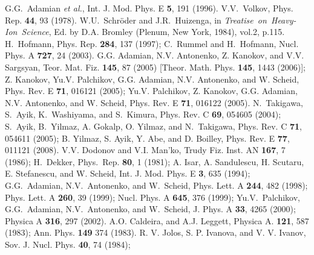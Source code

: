 \documentclass[preprint,review,12pt]{elsarticle}
\begin{document}




\begin{thebibliography}{99}
       G.G.~Adamian {\it et al.}, Int. J.  Mod. Phys. E {\bf 5}, 191 (1996).
         V.V.~Volkov, Phys. Rep. {\bf 44}, 93 (1978).
    W.U.~Schr\"oder and  J.R.~Huizenga, in {\it Treatise~on~Heavy-Ion~Science},
                      Ed. by D.A. Bromley (Plenum, New York, 1984), vol.2, p.115.
      H.~Hofmann, Phys. Rep.  {\bf 284}, 137 (1997);
                      C.~Rummel and H.~Hofmann, Nucl. Phys. A {\bf 727}, 24 (2003).
         G.G. Adamian, N.V. Antonenko, Z. Kanokov, and V.V. Sargsyan, Teor. Mat. Fiz. {\bf 145}, 87 (2005)
                      [Theor. Math. Phys. {\bf 145}, 1443 (2006)];
                      Z. Kanokov, Yu.V. Palchikov,  G.G. Adamian, N.V. Antonenko, and W. Scheid, Phys. Rev. E {\bf 71}, 016121 (2005);
                      Yu.V. Palchikov, Z. Kanokov,  G.G. Adamian, N.V. Antonenko, and W. Scheid, Phys. Rev. E {\bf 71}, 016122 (2005).
        N.~Takigawa, S.~Ayik, K.~Washiyama, and S.~Kimura, Phys. Rev. C {\bf 69}, 054605 (2004);
                      S.~Ayik, B.~Yilmaz, A. Gokalp, O. Yilmaz, and N.~Takigawa, Phys. Rev. C {\bf 71}, 054611 (2005);
                      B. Yilmaz, S. Ayik, Y. Abe, and D. Boilley, Phys. Rev. E {\bf 77}, 011121 (2008).
   V.V. Dodonov and V.I. Man'ko, Trudy Fiz. Inst. AN {\bf 167}, 7 (1986);  H.~Dekker, Phys.~Rep. {\bf 80}, 1 (1981);
                      A. Isar, A. Sandulescu, H. Scutaru, E. Stefanescu, and W. Scheid, Int. J. Mod. Phys. E {\bf 3}, 635 (1994);
                      G.G.~Adamian, N.V.~Antonenko, and  W.~Scheid, Phys. Lett. A {\bf 244},  482 (1998);
                      Phys. Lett. A {\bf 260}, 39 (1999); Nucl. Phys. A {\bf 645}, 376 (1999);
                      Yu.V.~Palchikov, G.G.~Adamian, N.V.~Antonenko, and  W.~Scheid, J. Phys. A {\bf 33}, 4265 (2000);
                      Physica A {\bf 316}, 297 (2002).
     A.O. Caldeira, and A.J. Leggett, Physica A. {\bf 121}, 587 (1983); Ann. Phys. {\bf 149} 374 (1983).
       R. V. Jolos, S. P. Ivanova, and V. V. Ivanov, Sov. J. Nucl. Phys. {\bf 40}, 74 (1984);

\end{thebibliography}
\end{document}
